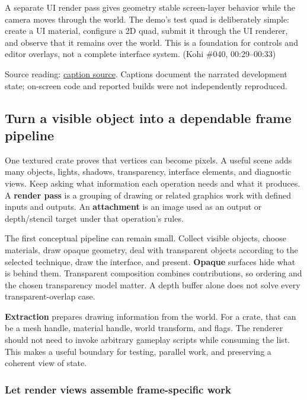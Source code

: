 A separate UI render pass gives geometry stable screen-layer behavior while the camera moves through the world. The demo's test quad is deliberately simple: create a UI material, configure a 2D quad, submit it through the UI renderer, and observe that it remains over the world. This is a foundation for controls and editor overlays, not a complete interface system. (Kohi \#040, 00:29--00:33)

Source reading: \href{https://www.youtube.com/watch?v=IolJ9Zt57uE}{caption source}. Captions document the narrated development state; on-screen code and reported builds were not independently reproduced.

\subsection{Turn a visible object into a dependable frame pipeline}\label{06-engine-ii-ch026-turn-a-visible-object-into-a-dependable-frame-pipeline}

\hypertarget{06-engine-ii-ch026-turn-a-visible-object-into-a-dependable-frame-pipeline}{}

One textured crate proves that vertices can become pixels. A useful scene adds many objects, lights, shadows, transparency, interface elements, and diagnostic views. Keep asking what information each operation needs and what it produces. A \textbf{render pass} is a grouping of drawing or related graphics work with defined inputs and outputs. An \textbf{attachment} is an image used as an output or depth/stencil target under that operation's rules.

The first conceptual pipeline can remain small. Collect visible objects, choose materials, draw opaque geometry, deal with transparent objects according to the selected technique, draw the interface, and present. \textbf{Opaque} surfaces hide what is behind them. Transparent composition combines contributions, so ordering and the chosen transparency model matter. A depth buffer alone does not solve every transparent-overlap case.

\textbf{Extraction} prepares drawing information from the world. For a crate, that can be a mesh handle, material handle, world transform, and flags. The renderer should not need to invoke arbitrary gameplay scripts while consuming the list. This makes a useful boundary for testing, parallel work, and preserving a coherent view of state.

\subsubsection{Let render views assemble frame-specific work}\label{06-engine-ii-ch026-let-render-views-assemble-frame-specific-work}

